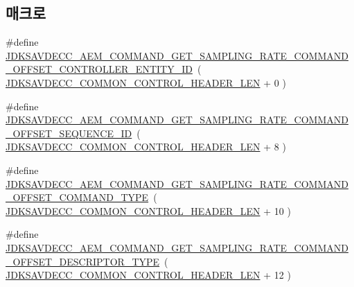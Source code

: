 \subsection*{매크로}
\begin{DoxyCompactItemize}
\item 
\#define \hyperlink{group__command__get__sampling__rate_ga2a0f7ce5c6667fd5267a38e747afa44e}{J\+D\+K\+S\+A\+V\+D\+E\+C\+C\+\_\+\+A\+E\+M\+\_\+\+C\+O\+M\+M\+A\+N\+D\+\_\+\+G\+E\+T\+\_\+\+S\+A\+M\+P\+L\+I\+N\+G\+\_\+\+R\+A\+T\+E\+\_\+\+C\+O\+M\+M\+A\+N\+D\+\_\+\+O\+F\+F\+S\+E\+T\+\_\+\+C\+O\+N\+T\+R\+O\+L\+L\+E\+R\+\_\+\+E\+N\+T\+I\+T\+Y\+\_\+\+ID}~( \hyperlink{group__jdksavdecc__avtp__common__control__header_gaae84052886fb1bb42f3bc5f85b741dff}{J\+D\+K\+S\+A\+V\+D\+E\+C\+C\+\_\+\+C\+O\+M\+M\+O\+N\+\_\+\+C\+O\+N\+T\+R\+O\+L\+\_\+\+H\+E\+A\+D\+E\+R\+\_\+\+L\+EN} + 0 )
\item 
\#define \hyperlink{group__command__get__sampling__rate_ga5e8759eca2486f62663ee3558ebea40b}{J\+D\+K\+S\+A\+V\+D\+E\+C\+C\+\_\+\+A\+E\+M\+\_\+\+C\+O\+M\+M\+A\+N\+D\+\_\+\+G\+E\+T\+\_\+\+S\+A\+M\+P\+L\+I\+N\+G\+\_\+\+R\+A\+T\+E\+\_\+\+C\+O\+M\+M\+A\+N\+D\+\_\+\+O\+F\+F\+S\+E\+T\+\_\+\+S\+E\+Q\+U\+E\+N\+C\+E\+\_\+\+ID}~( \hyperlink{group__jdksavdecc__avtp__common__control__header_gaae84052886fb1bb42f3bc5f85b741dff}{J\+D\+K\+S\+A\+V\+D\+E\+C\+C\+\_\+\+C\+O\+M\+M\+O\+N\+\_\+\+C\+O\+N\+T\+R\+O\+L\+\_\+\+H\+E\+A\+D\+E\+R\+\_\+\+L\+EN} + 8 )
\item 
\#define \hyperlink{group__command__get__sampling__rate_gaa21725ae2bf4d0859e7268637b1907af}{J\+D\+K\+S\+A\+V\+D\+E\+C\+C\+\_\+\+A\+E\+M\+\_\+\+C\+O\+M\+M\+A\+N\+D\+\_\+\+G\+E\+T\+\_\+\+S\+A\+M\+P\+L\+I\+N\+G\+\_\+\+R\+A\+T\+E\+\_\+\+C\+O\+M\+M\+A\+N\+D\+\_\+\+O\+F\+F\+S\+E\+T\+\_\+\+C\+O\+M\+M\+A\+N\+D\+\_\+\+T\+Y\+PE}~( \hyperlink{group__jdksavdecc__avtp__common__control__header_gaae84052886fb1bb42f3bc5f85b741dff}{J\+D\+K\+S\+A\+V\+D\+E\+C\+C\+\_\+\+C\+O\+M\+M\+O\+N\+\_\+\+C\+O\+N\+T\+R\+O\+L\+\_\+\+H\+E\+A\+D\+E\+R\+\_\+\+L\+EN} + 10 )
\item 
\#define \hyperlink{group__command__get__sampling__rate_ga133de4a2ba42bd2704863a68f74abcd3}{J\+D\+K\+S\+A\+V\+D\+E\+C\+C\+\_\+\+A\+E\+M\+\_\+\+C\+O\+M\+M\+A\+N\+D\+\_\+\+G\+E\+T\+\_\+\+S\+A\+M\+P\+L\+I\+N\+G\+\_\+\+R\+A\+T\+E\+\_\+\+C\+O\+M\+M\+A\+N\+D\+\_\+\+O\+F\+F\+S\+E\+T\+\_\+\+D\+E\+S\+C\+R\+I\+P\+T\+O\+R\+\_\+\+T\+Y\+PE}~( \hyperlink{group__jdksavdecc__avtp__common__control__header_gaae84052886fb1bb42f3bc5f85b741dff}{J\+D\+K\+S\+A\+V\+D\+E\+C\+C\+\_\+\+C\+O\+M\+M\+O\+N\+\_\+\+C\+O\+N\+T\+R\+O\+L\+\_\+\+H\+E\+A\+D\+E\+R\+\_\+\+L\+EN} + 12 )

\end{DoxyCompactItemize}
